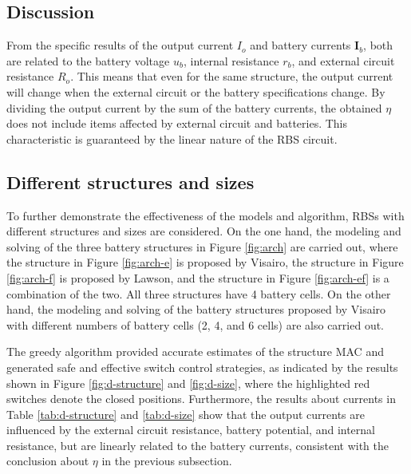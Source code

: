 \documentclass{article}
\begin{document}
\subsection{Discussion}







From the specific results of the output current $I_o$ and battery currents $\bm{I}_b$, both are related to the battery voltage $u_b$, internal resistance $r_b$, and external circuit resistance $R_o$.
This means that even for the same structure, the output current will change when the external circuit  or the battery specifications  change.
By dividing the output current by the sum of the battery currents, the obtained $\eta$ does not include items affected by external circuit and batteries.
This characteristic is guaranteed by the linear nature of the RBS circuit.

\subsection{Different structures and sizes}

To further demonstrate the effectiveness of the models and algorithm, RBSs with different structures and sizes are considered.
On the one hand, the modeling and solving of the three battery structures in Figure \ref{fig:arch} are carried out, where the structure in Figure \ref{fig:arch-e} is proposed by Visairo\cite{visairoReconfigurableBatteryPack2008}, the structure in Figure \ref{fig:arch-f} is proposed by Lawson\cite{lawsonSoftwareConfigurableBattery2012}, and the structure in Figure \ref{fig:arch-ef} is a combination of the two. All three structures have 4 battery cells.
On the other hand, the modeling and solving of the battery structures proposed by Visairo\cite{visairoReconfigurableBatteryPack2008} with different numbers of battery cells (2, 4, and 6 cells) are also carried out.

The greedy algorithm provided accurate estimates of the structure MAC and generated safe and effective switch control strategies, as indicated by the results shown in Figure \ref{fig:d-structure} and \ref{fig:d-size}, where the highlighted red switches denote the closed positions.
Furthermore, the results about currents in Table \ref{tab:d-structure} and \ref{tab:d-size} show that the output currents are influenced by the external circuit resistance, battery potential, and internal resistance, but are linearly related to the battery currents, consistent with the conclusion about $\eta$ in the previous subsection.
\end{document}
